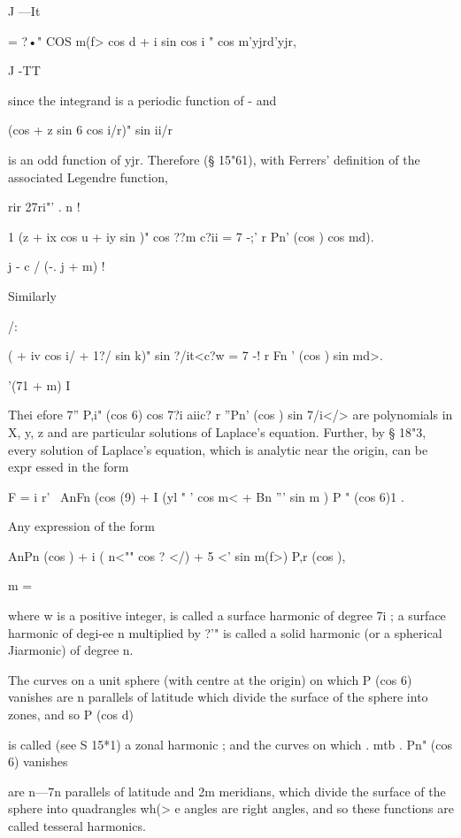 J —It

= ?•" COS m(f> cos d + i sin cos i " cos m'yjrd'yjr,

J -TT

since the integrand is a periodic function of - and

(cos + z sin 6 cos i/r)" sin ii/r

is an odd function of yjr. Therefore (§ 15"61), with Ferrers'
definition of the associated Legendre function,

rir 27ri"' . n !

1 (z + ix cos u + iy sin )" cos ??m c?ii = 7 -;' r Pn' (cos ) cos md).

j - c / (-. j + m) !

Similarly



/:



( + iv cos i/ + 1?/ sin k)" sin ?/it<c?w = 7 -! r Fn ' (cos ) sin md>.

'(71 + m) I



Thei efore 7'' P,i" (cos 6) cos 7?i aiic? r ''Pn' (cos ) sin 7/i</>
are polynomials in X, y, z and are particular solutions of Laplace's
equation. Further, by § 18"3, every solution of Laplace's equation,
which is analytic near the origin, can be expr essed in the form

F = i r' \ AnFn (cos (9) + I (yl " ' cos m< + Bn ''' sin m ) P " (cos
6)1 .

Any expression of the form

AnPn (cos ) + i ( n<"" cos ? </) + 5 <' sin m(f>) P,r (cos ),

m = \

where w is a positive integer, is called a surface harmonic of degree
7i ; a surface harmonic of degi-ee n multiplied by ?'" is called a
solid harmonic (or a spherical Jiarmonic) of degree n.

The curves on a unit sphere (with centre at the origin) on which P
(cos 6) vanishes are n parallels of latitude which divide the surface
of the sphere into zones, and so P (cos d)

is called (see S 15*1) a zonal harmonic ; and the curves on which .
mtb . Pn" (cos 6) vanishes

are n—7n parallels of latitude and 2m meridians, which divide the
surface of the sphere into quadrangles wh(> e angles are right angles,
and so these functions are called tesseral harmonics.




